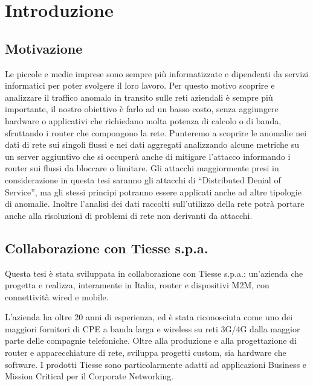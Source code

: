 
\chapter{Introduzione}

\section{Motivazione}

Le piccole e medie imprese sono sempre più informatizzate e dipendenti da servizi informatici per poter svolgere il loro lavoro. Per questo motivo scoprire e analizzare il traffico anomalo in transito sulle reti aziendali è sempre più importante, il nostro obiettivo è farlo ad un basso costo, senza aggiungere hardware o applicativi che richiedano molta potenza di calcolo o di banda, sfruttando i router che compongono la rete. Punteremo a scoprire le anomalie nei dati di rete sui singoli flussi e nei dati aggregati analizzando alcune metriche su un server aggiuntivo che si occuperà anche di mitigare l'attacco informando i router sui flussi da bloccare o limitare.
Gli attacchi maggiormente presi in considerazione in questa tesi saranno gli attacchi di ``Distributed Denial of Service'', ma gli stessi principi potranno essere applicati anche ad altre tipologie di anomalie.
Inoltre l'analisi dei dati raccolti sull'utilizzo della rete potrà portare anche alla risoluzioni di problemi di rete non derivanti da attacchi.

\section{Collaborazione con Tiesse s.p.a.}

Questa tesi è stata sviluppata in collaborazione con Tiesse s.p.a.: un'azienda che progetta e realizza, interamente in Italia, router e dispositivi M2M, con connettività wired e mobile.

L'azienda ha oltre 20 anni di esperienza, ed è stata riconosciuta come uno dei maggiori fornitori di CPE a banda larga e wireless su reti 3G/4G dalla maggior parte delle compagnie telefoniche. Oltre alla produzione e alla progettazione di router e apparecchiature di rete, sviluppa progetti custom, sia hardware che software. I prodotti Tiesse sono particolarmente adatti ad applicazioni Business e Mission Critical per il Corporate Networking.


